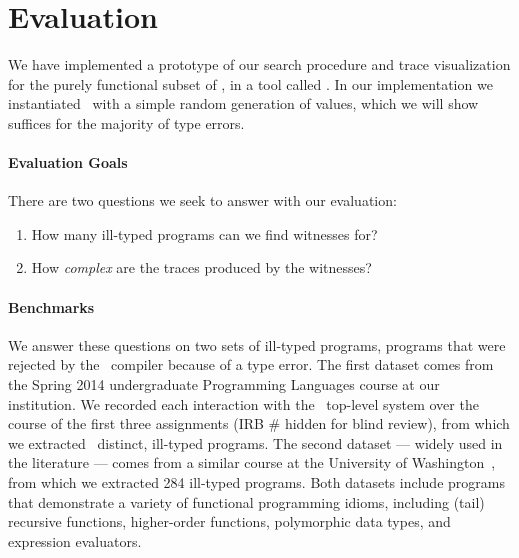 \section{Evaluation}
\label{sec:evaluation}

We have implemented a prototype of our search procedure and trace
visualization for the purely functional subset of \ocaml, in a tool called \nanomaly.
In our implementation we instantiated \gensym\ with a simple random
generation of values, which we will show suffices for the
majority of type errors.

\paragraph{Evaluation Goals}
%
There are two questions we seek to answer with our evaluation:
%
\begin{enumerate}
\item {}
      How many ill-typed programs can we find witnesses for?
\item {}
      How \emph{complex} are the traces produced by the witnesses?
\end{enumerate}

\paragraph{Benchmarks}
We answer these questions on two sets of ill-typed programs, \ie
programs that were rejected by the \ocaml\ compiler because of a
type error.
%
The first dataset comes from the Spring 2014 undergraduate Programming
Languages course at our institution.
%
We recorded each interaction with the \ocaml\ top-level system over the
course of the first three assignments (IRB  
\# hidden for blind review), 
from which we extracted \ucsdsize\ distinct, ill-typed \ocaml programs.
%
The second dataset --- widely used in the literature --- comes from a
similar course at the University of Washington~\cite{lerner_seminal:_2006},
from which we extracted 284 ill-typed programs.
%
Both datasets include programs that demonstrate a variety of functional
programming idioms, including (tail) recursive functions, higher-order
functions, polymorphic data types, and expression evaluators.

